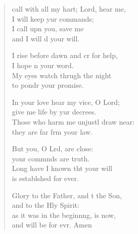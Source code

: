 \settowidth{\versewidth}{I call with all my heart; Lord, hear me, *}
\begin{verse}%
  \begin{patverse}
     call with all my hart; Lord, hear me,\Med\\
I will keep yur commands;\\
I call upn you, save me\Med\\
and I will d your will.

I rise before dawn and cr for help,\Med\\
I hope n your word.\\
My eyes watch thrugh the night\Med\\
to pondr your promise.

In your love hear my vice, O Lord;\Med\\
give me life by yur decrees.\\
Those who harm me unjustl draw near:\Med\\
they are far frm your law.

But you, O Lrd, are close:\Med\\
your commnds are truth.\\
Long have I known tht your will\Med\\
is establshed for ever.

Glory to the Father, and t the Son,\Med\\
and to the Hly Spirit:\\
as it was in the beginn\pointup{\i}ng, is now,\Med\\
and will be for evr. Amen
  \end{patverse}
\end{verse}
